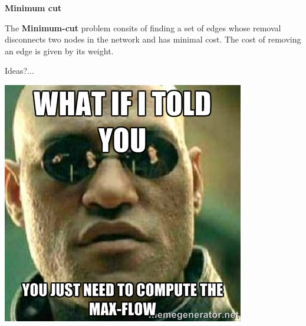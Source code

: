 \documentclass{beamer}
\begin{document}
\begin{frame}
\begin{center}
{\color{black} \huge{\textbf{Minimum cut}}}
\end{center}
\end{frame}

\begin{frame}

The \textbf{Minimum-cut} problem consits of finding a set of edges whose removal
disconnects two nodes in the network and has minimal cost. The cost of removing an edge
is given by its weight.

\vspace{2cm}

\pause

Ideas?...

\end{frame}


\begin{frame}
\begin{center}
\includegraphics[scale = 0.8]{mincut.jpg}
\end{center}
\end{frame}


\end{document}
